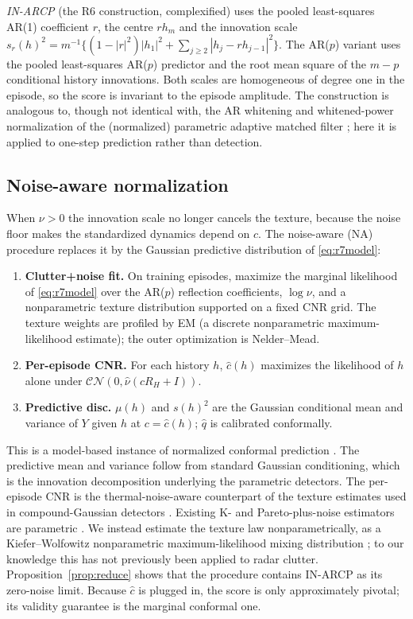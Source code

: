 \emph{IN-ARCP} (the R6 construction, complexified) uses the pooled least-squares AR(1) coefficient $r$, the centre $rh_m$ and the innovation scale $s_r(h)^2=m^{-1}\{(1-|r|^2)|h_1|^2+\sum_{j\ge2}|h_j-rh_{j-1}|^2\}$. The AR($p$) variant uses the pooled least-squares AR($p$) predictor and the root mean square of the $m-p$ conditional history innovations. Both scales are homogeneous of degree one in the episode, so the score is invariant to the episode amplitude. The construction is analogous to, though not identical with, the AR whitening and whitened-power normalization of the (normalized) parametric adaptive matched filter \cite{roman2000,michels2000}; here it is applied to one-step prediction rather than detection.

\subsection{Noise-aware normalization}
When $\nu>0$ the innovation scale no longer cancels the texture, because the noise floor makes the standardized dynamics depend on $c$. The noise-aware (NA) procedure replaces it by the Gaussian predictive distribution of \eqref{eq:r7model}:
\begin{enumerate}[leftmargin=*,itemsep=2pt]
\item \textbf{Clutter+noise fit.} On training episodes, maximize the marginal likelihood of \eqref{eq:r7model} over the AR($p$) reflection coefficients, $\log\nu$, and a nonparametric texture distribution supported on a fixed CNR grid. The texture weights are profiled by EM (a discrete nonparametric maximum-likelihood estimate); the outer optimization is Nelder--Mead.
\item \textbf{Per-episode CNR.} For each history $h$, $\widehat c(h)$ maximizes the likelihood of $h$ alone under $\mathcal{CN}(0,\widehat\nu(cR_H+I))$.
\item \textbf{Predictive disc.} $\mu(h)$ and $s(h)^2$ are the Gaussian conditional mean and variance of $Y$ given $h$ at $c=\widehat c(h)$; $\widehat q$ is calibrated conformally.
\end{enumerate}
This is a model-based instance of normalized conformal prediction \cite{dewolf2025}. The predictive mean and variance follow from standard Gaussian conditioning, which is the innovation decomposition underlying the parametric detectors. The per-episode CNR is the thermal-noise-aware counterpart of the texture estimates used in compound-Gaussian detectors \cite{greco2001,gini2002}. Existing K- and Pareto-plus-noise estimators are parametric \cite{watts1987,bocquet2015,mezache2016}. We instead estimate the texture law nonparametrically, as a Kiefer--Wolfowitz nonparametric maximum-likelihood mixing distribution \cite{kiefer1956,laird1978,koenker2014}; to our knowledge this has not previously been applied to radar clutter. Proposition~\ref{prop:reduce} shows that the procedure contains IN-ARCP as its zero-noise limit. Because $\widehat c$ is plugged in, the score is only approximately pivotal; its validity guarantee is the marginal conformal one.

